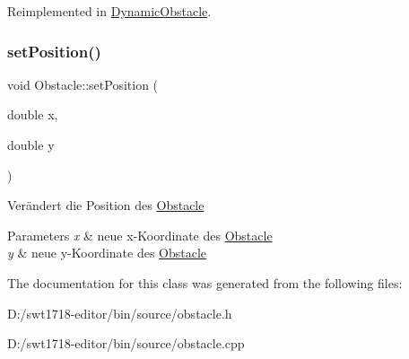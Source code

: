 Reimplemented in \mbox{\hyperlink{class_dynamic_obstacle_a30c0753280f05f69a9da89bc9d9ce3f6}{Dynamic\+Obstacle}}.

\mbox{\label{class_obstacle_a601d8574fb13298bf693f0e4a2a5982f}} 
\subsubsection{\texorpdfstring{set\+Position()}{setPosition()}}
{\footnotesize\ttfamily void Obstacle\+::set\+Position (\begin{DoxyParamCaption}\item[{double}]{x,  }\item[{double}]{y }\end{DoxyParamCaption})}

Verändert die Position des \mbox{\hyperlink{class_obstacle}{Obstacle}} 
\begin{DoxyParams}{Parameters}
{\em x} & neue x-\/\+Koordinate des \mbox{\hyperlink{class_obstacle}{Obstacle}} \\
\hline
{\em y} & neue y-\/\+Koordinate des \mbox{\hyperlink{class_obstacle}{Obstacle}} \\
\hline
\end{DoxyParams}


The documentation for this class was generated from the following files\+:\begin{DoxyCompactItemize}
\item 
D\+:/swt1718-\/editor/bin/source/obstacle.\+h\item 
D\+:/swt1718-\/editor/bin/source/obstacle.\+cpp\end{DoxyCompactItemize}
